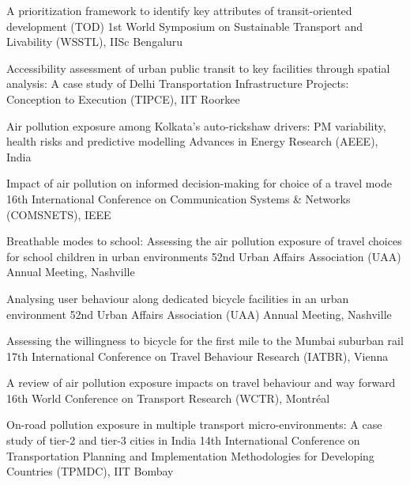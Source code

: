 \documentclass[10pt, a4paper]{article}
\begin{document}
\begin{cvlist}
    {A prioritization framework to identify key attributes of transit-oriented development (TOD)}
    {1st World Symposium on Sustainable Transport and Livability (WSSTL), IISc Bengaluru}{}

    {Accessibility assessment of urban public transit to key facilities through spatial analysis:
     A case study of Delhi}
    {Transportation Infrastructure Projects: Conception to Execution (TIPCE), IIT Roorkee}{}

    {Air pollution exposure among Kolkata's auto-rickshaw drivers: PM variability, health risks
     and predictive modelling}
    {Advances in Energy Research (AEEE), India}{}

    {Impact of air pollution on informed decision-making for choice of a travel mode}
    {16th International Conference on Communication Systems \& Networks (COMSNETS), IEEE}
    {}

    {Breathable modes to school: Assessing the air pollution exposure of travel choices for school
     children in urban environments}
    {52nd Urban Affairs Association (UAA) Annual Meeting, Nashville}{}

    {Analysing user behaviour along dedicated bicycle facilities in an urban environment}
    {52nd Urban Affairs Association (UAA) Annual Meeting, Nashville}{}

    {Assessing the willingness to bicycle for the first mile to the Mumbai suburban rail}
    {17th International Conference on Travel Behaviour Research (IATBR), Vienna}{}

    {A review of air pollution exposure impacts on travel behaviour and way forward}
    {16th World Conference on Transport Research (WCTR), Montr\'eal}{}

    {On-road pollution exposure in multiple transport micro-environments: A case study of tier-2
     and tier-3 cities in India}
    {14th International Conference on Transportation Planning and Implementation Methodologies
     for Developing Countries (TPMDC), IIT Bombay}{}
\end{cvlist}
\end{document}
